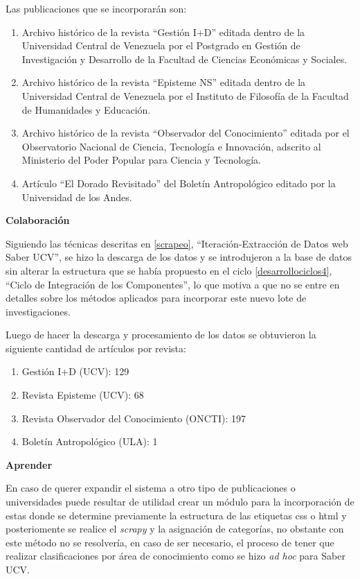 \documentclass[
  12pt,
  openany]{book}
\begin{document}
Las publicaciones que se incorporarán son:

\begin{enumerate}
\def\labelenumi{\arabic{enumi}.}
\item
  Archivo histórico de la revista ``Gestión I+D'' editada dentro de la Universidad Central de Venezuela por el Postgrado en Gestión de Investigación y Desarrollo de la Facultad de Ciencias Económicas y Sociales.
\item
  Archivo histórico de la revista ``Episteme NS'' editada dentro de la Universidad Central de Venezuela por el Instituto de Filosofía de la Facultad de Humanidades y Educación.
\item
  Archivo histórico de la revista ``Observador del Conocimiento'' editada por el Observatorio Nacional de Ciencia, Tecnología e Innovación, adscrito al Ministerio del Poder Popular para Ciencia y Tecnología.
\item
  Artículo ``El Dorado Revisitado'' del Boletín Antropológico editado por la Universidad de los Andes.
\end{enumerate}

\textbf{Colaboración}

Siguiendo las técnicas descritas en \ref{scrapeo}, ``Iteración-Extracción de Datos web Saber UCV'', se hizo la descarga de los datos y se introdujeron a la base de datos sin alterar la estructura que se había propuesto en el ciclo \ref{desarrollociclos4}, ``Ciclo de Integración de los Componentes'', lo que motiva a que no se entre en detalles sobre los métodos aplicados para incorporar este nuevo lote de investigaciones.

Luego de hacer la descarga y procesamiento de los datos se obtuvieron la siguiente cantidad de artículos por revista:

\begin{enumerate}
\def\labelenumi{\arabic{enumi}.}
\item
  Gestión I+D (UCV): 129
\item
  Revista Episteme (UCV): 68
\item
  Revista Observador del Conocimiento (ONCTI): 197
\item
  Boletín Antropológico (ULA): 1
\end{enumerate}

\textbf{Aprender}

En caso de querer expandir el sistema a otro tipo de publicaciones o universidades puede resultar de utilidad crear un módulo para la incorporación de estas donde se determine previamente la estructura de las etiquetas css o html y posteriomente se realice el \emph{scrapy} y la asignación de categorías, no obstante con este método no se resolvería, en caso de ser necesario, el proceso de tener que realizar clasificaciones por área de conocimiento como se hizo \emph{ad hoc} para Saber UCV.
\end{document}
